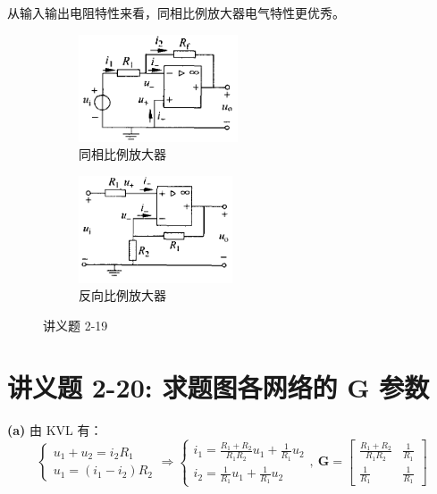 \documentclass[UTF8]{report}
\theoremstyle{MyLineTheoremStyle} %
\theoremstyle{MyBlockTheoremStyle} %
\theoremstyle{MySubsubsectionStyle} %
\begin{document}
从输入输出电阻特性来看，同相比例放大器电气特性更优秀。

\begin{figure}[H]\centering
\begin{subfigure}[t]{0.4\textwidth}\centering
    \includegraphics[height=90pt]{assets/3/反向比例放大器.png}
    \caption{ 同相比例放大器}
\end{subfigure}\begin{subfigure}[t]{0.4\textwidth}\centering
    \includegraphics[height=90pt]{assets/3/同相比例放大器.png}
    \caption{ 反向比例放大器}
\end{subfigure}
\caption{ 讲义题 2-19}
\end{figure}

\section{讲义题 2-20: 求题图各网络的 $\boldsymbol{G}$ 参数}
\textbf{(a)} 由 KVL 有：
\begin{equation}
\begin{cases}
    u_1 + u_2 = i_2R_1 \\
    u_1 = (i_1 - i_2)R_2
\end{cases}\Longrightarrow  
\begin{cases}
    i_1 = \frac{R_1 + R_2}{R_1R_2} u_1 + \frac{1}{R_1} u_2 \\ 
    i_2 = \frac{1}{R_1}u_1 + \frac{1}{R_1}u_2
\end{cases},\ 
\boldsymbol{G} = 
\begin{bmatrix}
    \frac{R_1 + R_2}{R_1R_2} & \frac{1}{R_1} \\ 
    \frac{1}{R_1} & \frac{1}{R_1}
\end{bmatrix}
\end{equation}
\end{document}
